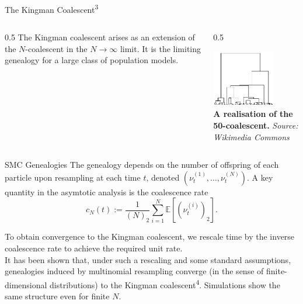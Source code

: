 \documentclass[final, 12pt]{beamer}
\newlength{\colwidth}
\newcommand{\vt}[2][t]{\nu_{#1}^{(#2)}}
\newcommand{\E}{\mathbb{E}}
\begin{document}
\begin{frame}
\begin{columns}
\begin{column}{\colwidth}
\begin{block}{The Kingman Coalescent\textsuperscript{3}}
\begin{columns}
\begin{column}{0.5\colwidth}
The Kingman coalescent arises as an extension of the $N$-coalescent in the $N\to\infty$ limit.
It is the limiting genealogy for a large class of population models.
\end{column}
\begin{column}{0.5\colwidth}
\begin{center}
\includegraphics[width=0.7\textwidth]{../kingman.png}\\
\small{
\textbf{A realisation of the 50-coalescent.}
\textit{Source: Wikimedia Commons}
}
\end{center}
\end{column}
\end{columns}
\end{block}

\begin{block}{SMC Genealogies}
The genealogy depends on the number of offspring of each particle upon resampling at each time $t$, denoted $(\vt{1}, \dots, \vt{N})$.
A key quantity in the asymtotic analysis is the coalescence rate
\begin{equation*}
c_N(t) := \frac{1}{(N)_2} \sum_{i=1}^{N} \E\left[ (\vt{i})_2 \right].
\end{equation*}

To obtain convergence to the Kingman coalescent, we rescale time by the inverse coalescence rate to achieve the required unit rate.\\[10pt]

It has been shown that, under such a rescaling and some standard assumptions, genealogies induced by multinomial resampling converge (in the sense of finite-dimensional distributions) to the Kingman coalescent\textsuperscript{4}. Simulations show the same structure even for finite $N$.\\[10pt]


\end{block}
\end{column}
\end{columns}
\end{frame}
\end{document}
